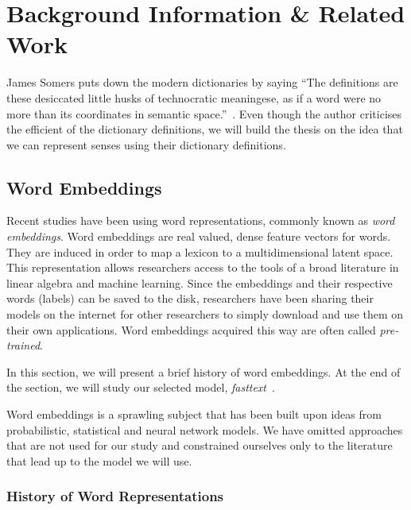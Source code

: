 
\chapter{Background Information \& Related Work}\label{chap:background_n_related}

James Somers puts down the modern dictionaries by saying \enquote{The definitions are these desiccated little husks of technocratic meaningese, as if a word were no more than its coordinates in semantic space.}~\cite{somers_youre_2014}.
Even though the author criticises the efficient of the dictionary definitions, we will build the thesis on the idea that we can represent senses using their dictionary definitions.

\section{Word Embeddings}%
\label{sec:word_embeddings}

Recent studies have been using word representations, commonly known as \emph{word embeddings}.
Word embeddings are real valued, dense feature vectors for words.
They are induced in order to map a lexicon to a multidimensional latent space.
This representation allows researchers access to the tools of a broad literature in linear algebra and machine learning.
Since the embeddings and their respective words (labels) can be saved to the disk, researchers have been sharing their models on the internet for other researchers to simply download and use them on their own applications.
Word embeddings acquired this way are often called \emph{pre-trained}.

In this section, we will present a brief history of word embeddings.
At the end of the section, we will study our selected model, \emph{fasttext}~\cite{mikolov2018advances}.

Word embeddings is a sprawling subject that has been built upon ideas from probabilistic, statistical and neural network models.
We have omitted approaches that are not used for our study and constrained ourselves only to the literature that lead up to the model we will use. %

\subsection{History of Word Representations}%
\label{sub:history_of_word_representations}

